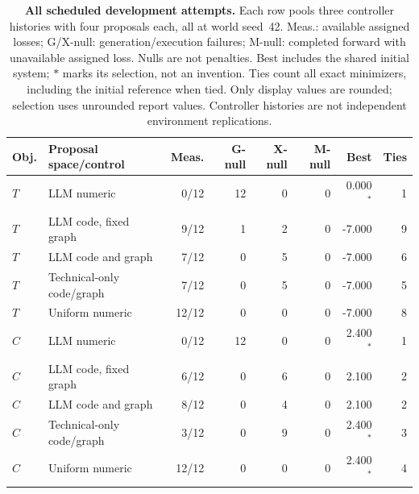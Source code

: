 \begin{table}[t]
\centering\small
\begin{tabular}{@{}llrrrrrr@{}}
\toprule
Obj. & Proposal space/control & Meas. & G-null & X-null & M-null & Best & Ties\\
\midrule
$T$ & LLM numeric & 0/12 & 12 & 0 & 0 & 0.000$^{\ast}$ & 1\\
$T$ & LLM code, fixed graph & 9/12 & 1 & 2 & 0 & -7.000 & 9\\
$T$ & LLM code and graph & 7/12 & 0 & 5 & 0 & -7.000 & 6\\
$T$ & Technical-only code/graph & 7/12 & 0 & 5 & 0 & -7.000 & 5\\
$T$ & Uniform numeric & 12/12 & 0 & 0 & 0 & -7.000 & 8\\
\midrule
$C$ & LLM numeric & 0/12 & 12 & 0 & 0 & 2.400$^{\ast}$ & 1\\
$C$ & LLM code, fixed graph & 6/12 & 0 & 6 & 0 & 2.100 & 2\\
$C$ & LLM code and graph & 8/12 & 0 & 4 & 0 & 2.100 & 2\\
$C$ & Technical-only code/graph & 3/12 & 0 & 9 & 0 & 2.400$^{\ast}$ & 3\\
$C$ & Uniform numeric & 12/12 & 0 & 0 & 0 & 2.400$^{\ast}$ & 4\\
\bottomrule
\end{tabular}
\caption{\textbf{All scheduled development attempts.} Each row pools three
controller histories with four proposals each, all at world seed~42.
Meas.: available assigned losses; G/X-null: generation/execution failures;
M-null: completed forward with unavailable assigned loss. Nulls are not penalties.
Best includes the shared initial system; $\ast$ marks its selection, not an invention.
Ties count all exact minimizers, including the initial reference when tied.
Only display values are rounded; selection uses unrounded report values.
Controller histories are not independent environment replications.
}
\label{tab:v2-search-outcomes}
\end{table}
